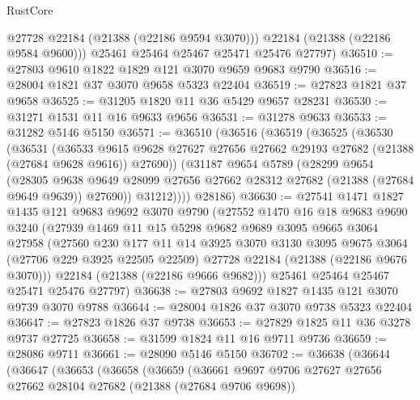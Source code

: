 \begin{lexlean}{RustCore}
\begin{coremodule}
          @27728
          @22184
          (@21388 (@22186 @9594 @3070)))
        @22184
        (@21388 (@22186 @9584 @9600)))
      @25461
      @25464
      @25467
      @25471
      @25476
      @27797)
@36510 := @27803 @9610 @1822 @1829 @121 @3070 @9659 @9683 @9790
@36516 := @28004 @1821 @37 @3070 @9658 @5323 @22404
@36519 := @27823 @1821 @37 @9658
@36525 := @31205 @1820 @11 @36 @5429 @9657 @28231
@36530 := @31271 @1531 @11 @16 @9633 @9656
@36531 := @31278 @9633
@36533 := @31282 @5146 @5150
@36571 := @36510
    (@36516
      (@36519
        (@36525
          (@36530
            (@36531
              (@36533
                @9615
                @9628
                @27627
                @27656
                @27662
                @29193
                @27682
                (@21388 (@27684 @9628 @9616))
                @27690))
            (@31187
              @9654
              @5789
              (@28299
                @9654
                (@28305
                  @9638
                  @9649
                  @28099
                  @27656
                  @27662
                  @28312
                  @27682
                  (@21388 (@27684 @9649 @9639))
                  @27690))
              @31212))))
      @28186)
@36630 := @27541
    @1471
    @1827
    @1435
    @121
    @9683
    @9692
    @3070
    @9790
    (@27552
      @1470
      @16
      @18
      @9683
      @9690
      @3240
      (@27939
        @1469
        @11
        @15
        @5298
        @9682
        @9689
        @3095
        @9665
        @3064
        @27958
        (@27560
          @230
          @177
          @11
          @14
          @3925
          @3070
          @3130
          @3095
          @9675
          @3064
          (@27706 @229 @3925 @22505 @22509)
          @27728
          @22184
          (@21388 (@22186 @9676 @3070)))
        @22184
        (@21388 (@22186 @9666 @9682)))
      @25461
      @25464
      @25467
      @25471
      @25476
      @27797)
@36638 := @27803 @9692 @1827 @1435 @121 @3070 @9739 @3070 @9788
@36644 := @28004 @1826 @37 @3070 @9738 @5323 @22404
@36647 := @27823 @1826 @37 @9738
@36653 := @27829 @1825 @11 @36 @3278 @9737 @27725
@36658 := @31599 @1824 @11 @16 @9711 @9736
@36659 := @28086 @9711
@36661 := @28090 @5146 @5150
@36702 := @36638
    (@36644
      (@36647
        (@36653
          (@36658
            (@36659
              (@36661
                @9697
                @9706
                @27627
                @27656
                @27662
                @28104
                @27682
                (@21388 (@27684 @9706 @9698))

\end{coremodule}
\end{lexlean}
